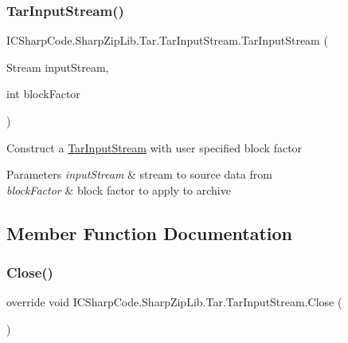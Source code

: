 \subsubsection{\texorpdfstring{Tar\+Input\+Stream()}{TarInputStream()}\hspace{0.1cm}{\footnotesize\ttfamily [2/2]}}
{\footnotesize\ttfamily I\+C\+Sharp\+Code.\+Sharp\+Zip\+Lib.\+Tar.\+Tar\+Input\+Stream.\+Tar\+Input\+Stream (\begin{DoxyParamCaption}\item[{Stream}]{input\+Stream,  }\item[{int}]{block\+Factor }\end{DoxyParamCaption})\hspace{0.3cm}{\ttfamily [inline]}}



Construct a \hyperlink{class_i_c_sharp_code_1_1_sharp_zip_lib_1_1_tar_1_1_tar_input_stream}{Tar\+Input\+Stream} with user specified block factor 


\begin{DoxyParams}{Parameters}
{\em input\+Stream} & stream to source data from\\
\hline
{\em block\+Factor} & block factor to apply to archive\\
\hline
\end{DoxyParams}


\subsection{Member Function Documentation}
\mbox{\label{class_i_c_sharp_code_1_1_sharp_zip_lib_1_1_tar_1_1_tar_input_stream_a0e00dc015294bb80b69c144622a861e5}} 
\subsubsection{\texorpdfstring{Close()}{Close()}}
{\footnotesize\ttfamily override void I\+C\+Sharp\+Code.\+Sharp\+Zip\+Lib.\+Tar.\+Tar\+Input\+Stream.\+Close (\begin{DoxyParamCaption}{ }\end{DoxyParamCaption})\hspace{0.3cm}{\ttfamily [inline]}}



